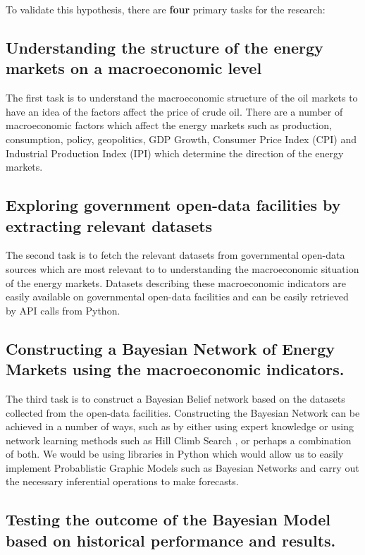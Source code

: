 To validate this hypothesis, there are \textbf{four} primary tasks for the research:

\subsection{Understanding the structure of the energy markets on a macroeconomic level}

The first task is to understand the macroeconomic structure of the oil markets to have an idea of the factors affect the price of crude oil. There are a number of macroeconomic factors \cite{Lee2017} which affect the energy markets such as production, consumption, policy, geopolitics, GDP Growth, Consumer Price Index (CPI) and Industrial Production Index (IPI) which determine the direction of the energy markets.

\subsection{Exploring government open-data facilities by extracting relevant datasets}

The second task is to fetch the relevant datasets from governmental open-data sources which are most relevant to to understanding the macroeconomic situation of the energy markets. Datasets describing these macroeconomic indicators are easily available on governmental open-data facilities and can be easily retrieved by API calls from Python.

\subsection{Constructing a Bayesian Network of Energy Markets using the macroeconomic indicators.}

The third task is to construct a Bayesian Belief network based on the datasets collected from the open-data facilities. Constructing the Bayesian Network can be achieved in a number of ways, such as by either using expert knowledge or using network learning methods such as Hill Climb Search \cite{neapolitan2004learning}, or perhaps a combination of both. We would be using libraries in Python which would allow us to easily implement Probablistic Graphic Models such as Bayesian Networks and carry out the necessary inferential operations to make forecasts.

\subsection{Testing the outcome of the Bayesian Model based on historical performance and results.}

